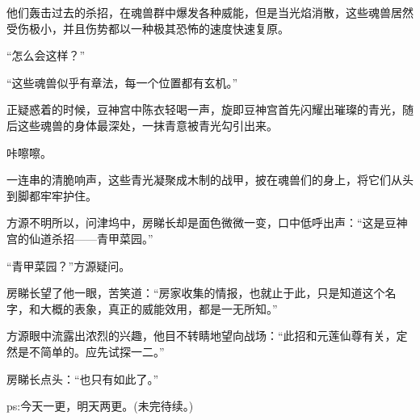 \begin{this_body}
他们轰击过去的杀招，在魂兽群中爆发各种威能，但是当光焰消散，这些魂兽居然受伤极小，并且伤势都以一种极其恐怖的速度快速复原。

“怎么会这样？”

“这些魂兽似乎有章法，每一个位置都有玄机。”

正疑惑着的时候，豆神宫中陈衣轻喝一声，旋即豆神宫首先闪耀出璀璨的青光，随后这些魂兽的身体最深处，一抹青意被青光勾引出来。

咔嚓嚓。

一连串的清脆响声，这些青光凝聚成木制的战甲，披在魂兽们的身上，将它们从头到脚都牢牢护住。

方源不明所以，问津坞中，房睇长却是面色微微一变，口中低呼出声：“这是豆神宫的仙道杀招——青甲菜园。”

“青甲菜园？”方源疑问。

房睇长望了他一眼，苦笑道：“房家收集的情报，也就止于此，只是知道这个名字，和大概的表象，真正的威能效用，都是一无所知。”

方源眼中流露出浓烈的兴趣，他目不转睛地望向战场：“此招和元莲仙尊有关，定然是不简单的。应先试探一二。”

房睇长点头：“也只有如此了。”

ps:今天一更，明天两更。(未完待续。)

\end{this_body}

